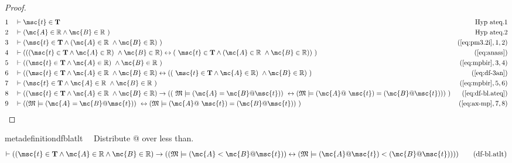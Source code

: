 \begin{proof}
\begin{align}
  1 &&  & \vdash \msc{t} \in \mathbf{T}&\text{Hyp~ateq.1}\notag%
  \\ 2 &&  & \vdash ( \mc{A} \in \mathbb{R} \wedge \mc{B} \in \mathbb{R}
     ~)&\text{Hyp~ateq.2}\notag%
  \\ 3 &&  & \vdash ( \msc{t} \in \mathbf{T} \wedge ( \mc{A} \in \mathbb{R}
     ~\wedge \mc{B} \in \mathbb{R} )
     ~)&(\mbox{\ref{eq:pm3.2i}},1,2)\notag
  \\ 4 &&  & \vdash ( ( ( \msc{t} \in \mathbf{T} \wedge \mc{A} \in \mathbb{R} )
     ~\wedge \mc{B} \in \mathbb{R} ) \leftrightarrow (
     ~\msc{t} \in \mathbf{T} \wedge ( \mc{A} \in \mathbb{R}
     ~\wedge \mc{B} \in \mathbb{R} ) )
     ~)&(\mbox{\ref{eq:anass}})\notag
  \\ 5 &&  & \vdash ( ( \msc{t} \in \mathbf{T} \wedge \mc{A} \in \mathbb{R} )
     ~\wedge \mc{B} \in \mathbb{R}
     ~)&(\mbox{\ref{eq:mpbir}},3,4)\notag
  \\ 6 &&  & \vdash ( ( \msc{t} \in \mathbf{T} \wedge \mc{A} \in \mathbb{R}
     ~\wedge \mc{B} \in \mathbb{R} ) \leftrightarrow ( (
     ~\msc{t} \in \mathbf{T} \wedge \mc{A} \in \mathbb{R} )
     ~\wedge \mc{B} \in \mathbb{R} )
     ~)&(\mbox{\ref{eq:df-3an}})\notag
  \\ 7 &&  & \vdash ( \msc{t} \in \mathbf{T} \wedge \mc{A} \in \mathbb{R}
     ~\wedge \mc{B} \in \mathbb{R}
     ~)&(\mbox{\ref{eq:mpbir}},5,6)\notag
  \\ 8 &&  & \vdash ( ( \msc{t} \in \mathbf{T} \wedge \mc{A} \in \mathbb{R}
     ~\wedge \mc{B} \in \mathbb{R} ) \rightarrow ( (
     ~\mathfrak{M} \models ( \mc{A} = \mc{B} @ \msc{t} ) )
     ~\leftrightarrow ( \mathfrak{M} \models ( \mc{A} @
     ~\msc{t} ) = ( \mc{B} @ \msc{t} ) ) )
     ~)&(\mbox{\ref{eq:df-bl.ateq}})\notag
  \\ 9 &&  & \vdash ( ( \mathfrak{M} \models ( \mc{A} = \mc{B} @ \msc{t} ) )
     ~\leftrightarrow ( \mathfrak{M} \models ( \mc{A} @
     ~\msc{t} ) = ( \mc{B} @ \msc{t} ) )
     ~)&(\mbox{\ref{eq:ax-mp}},7,8)\notag
\end{align}
\end{proof}

\begin{restatable}{metadefinition}{dfblatlt}~~ Distribute @ over less than.
\begin{align}
\vdash ( ( \msc{t} \in \mathbf{T} \wedge \mc{A} \in \mathbb{R} \wedge \mc{B}
    \in \mathbb{R} ) \rightarrow ( ( \mathfrak{M} \models ( \mc{A} < \mc{B} @
    \msc{t} ) ) \leftrightarrow ( \mathfrak{M} \models ( \mc{A} @ \msc{t} ) < (
    \mc{B} @ \msc{t} ) ) ) )\label{eq:df-bl.atlt}\tag{df-bl.atlt}
\end{align}
\end{restatable}


